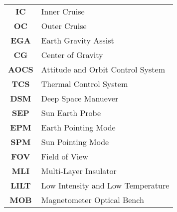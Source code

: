 \begin{multicols}{2}
{\begin{xltabular}{\linewidth}{c>{\raggedright\arraybackslash}X}
		\textbf{IC} & Inner Cruise \\
		\textbf{OC} & Outer Cruise \\
		\textbf{EGA} & Earth Gravity Assist\\
		\textbf{CG} & Center of Gravity \\
		\textbf{AOCS} & Attitude and Orbit Control System \\
		\textbf{TCS} & Thermal Control System \\
		\textbf{DSM} & Deep Space Manuever\\
		\textbf{SEP} & Sun Earth Probe \\
		\textbf{EPM} & Earth Pointing Mode \\
		\textbf{SPM} & Sun Pointing Mode \\
		\textbf{FOV} & Field of View \\
		\textbf{MLI} & Multi-Layer Insulator \\
		\textbf{LILT} & Low Intensity and Low Temperature \\
		\textbf{MOB} & Magnetometer Optical Bench \\
 	\end{xltabular}
	\unskip
	\unpenalty
	\unpenalty}
	\unvbox\ltmcbox
\end{multicols}